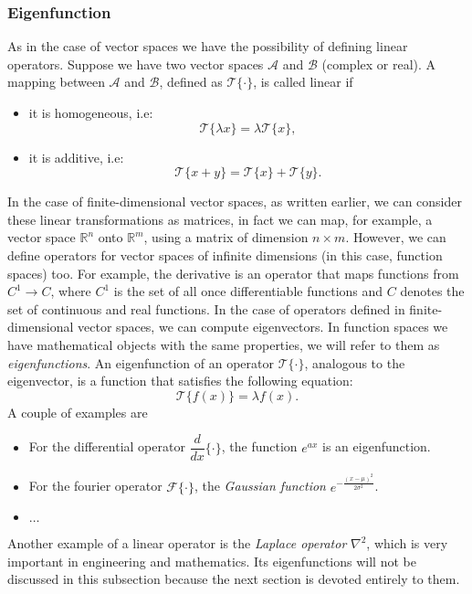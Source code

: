 \subsubsection{Eigenfunction \label{kugel:ssection:eigenfuntion}}
As in the case of vector spaces we have the possibility of defining linear operators.\newline 
Suppose we have two vector spaces $\mathcal{A}$ and $\mathcal{B}$ (complex or real). A mapping between $\mathcal{A}$ and $\mathcal{B}$, defined as $\mathcal{T}\{\cdot\}$, is called linear if
\begin{itemize}
\item it is homogeneous, i.e:
\begin{equation*}
    \mathcal{T}\{\lambda x\} = \lambda \mathcal{T}\{x\},
\end{equation*}
\item it is additive, i.e:
\begin{equation*}
    \mathcal{T}\{x+y\} = \mathcal{T}\{x\}+\mathcal{T}\{y\}.
\end{equation*}
\end{itemize}
In the case of finite-dimensional vector spaces, as written earlier, we can consider these linear transformations as matrices, in fact we can map, for example, a vector space $\mathbb{R}^n$ onto $\mathbb{R}^m$, using a matrix of dimension $n \times m$.\newline
However, we can define operators for vector spaces of infinite dimensions (in this case, function spaces) too.\newline
For example, the derivative is an operator that maps functions from $C^1\to C$, where $C^1$ is the set of all once differentiable functions and $C$ denotes the set of continuous and real functions.\newline
In the case of operators defined in finite-dimensional vector spaces, we can compute eigenvectors. In function spaces we have mathematical objects with the same properties, we will refer to them as \emph{eigenfunctions}.\newline 
An eigenfunction of an operator $\mathcal{T}\{\cdot\}$, analogous to the eigenvector, is a function that satisfies the following equation:
\begin{equation*}
\mathcal{T}\{f(x)\} = \lambda f(x).
\end{equation*}
A couple of examples are
\begin{itemize}
\item For the differential operator $\dfrac{d}{dx}\{\cdot\}$, the function $e^{ax}$ is an eigenfunction.
\item For the fourier operator $\mathcal{F}\{\cdot\}$, the \emph{Gaussian function} $e^{-\frac{(x-\mu)^2}{2\sigma^2}}$.
\item $\hdots$
\end{itemize}
Another example of a linear operator is the \emph{Laplace operator} $\nabla^2$, which is very important in engineering and mathematics. Its eigenfunctions will not be discussed in this subsection because the next section is devoted entirely to them. 